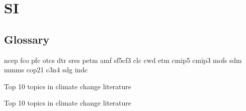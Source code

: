 \documentclass{article}
\begin{document}
\section{SI}

\subsection{Glossary}

ncep
fco
pfc
otcs
dtr
sres
petm
amf
sf5cf3
clc
cwd
etm
cmip5
cmip3
mofs
sdm
mmms
cop21
c3n4
sdg
indc

\begin{table}[h!]
	\scriptsize
	
	\caption{Top 10 topics in climate change literature}
	\label{top-topics}
\end{table}	

\begin{table}[h!]
	\scriptsize
	
	\caption{Top 10 topics in climate change literature}
	\label{top-topics}
\end{table}	
\end{document}

